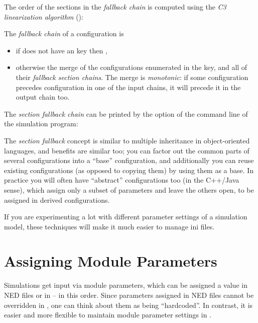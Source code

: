 The order of the sections in the \textit{fallback chain} is computed
using the \textit{C3 linearization algorithm} (\cite{Barrett1996}):

The \textit{fallback chain} of a configuration  is
\begin{itemize}
  \item{if  does not have an  key then
        , }
  \item{otherwise the merge of the configurations enumerated in
        the  key, and all of their
        \textit{fallback section chains}.
        The merge is \textit{monotonic}: if some configuration 
        precedes configuration  in one of the input chains,
        it will precede it in the output chain too. }
\end{itemize}

The \textit{section fallback chain} can be printed by the  option
of the command line of the simulation program:


The \textit{section fallback} concept is similar to multiple inheritance in
object-oriented languages, and benefits are similar too; you can factor out
the common parts of several configurations into a ``base'' configuration,
and additionally you can reuse existing configurations (as opposed to
copying them) by using them as a base. In practice you will often have
``abstract'' configurations too (in the C++/Java sense), which assign only
a subset of parameters and leave the others open, to be assigned in derived
configurations.

If you are experimenting a lot with different parameter settings of a
simulation model, these techniques will make it much easier to manage
ini files.

\section{Assigning Module Parameters}
\label{sec:config-sim:parameter-settings}

Simulations get input via module parameters, which can be assigned a
value in NED files or in  -- in this order. Since parameters
assigned in NED files cannot be overridden in , one can
think about them as being ``hardcoded''. In contrast, it is easier
and more flexible to maintain module parameter settings in .

